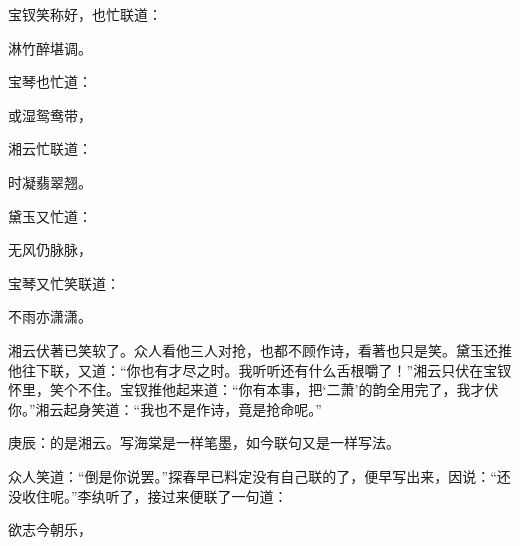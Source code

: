 \begin{parag}
    宝钗笑称好，也忙联道：
\end{parag}
\begin{poem}
    \begin{pl} 淋竹醉堪调。\end{pl}
\end{poem}


\begin{parag}
    宝琴也忙道：
\end{parag}
\begin{poem}
    \begin{pl} 或湿鸳鸯带，\end{pl}
\end{poem}


\begin{parag}
    湘云忙联道：
\end{parag}
\begin{poem}
    \begin{pl} 时凝翡翠翘。\end{pl}
\end{poem}


\begin{parag}
    黛玉又忙道：
\end{parag}
\begin{poem}
    \begin{pl} 无风仍脉脉，\end{pl}
\end{poem}


\begin{parag}
    宝琴又忙笑联道：
\end{parag}
\begin{poem}
    \begin{pl} 不雨亦潇潇。\end{pl}
\end{poem}


\begin{parag}
    湘云伏著已笑软了。众人看他三人对抢，也都不顾作诗，看著也只是笑。黛玉还推他往下联，又道：“你也有才尽之时。我听听还有什么舌根嚼了！”湘云只伏在宝钗怀里，笑个不住。宝钗推他起来道：“你有本事，把‘二萧’的韵全用完了，我才伏你。”湘云起身笑道：“我也不是作诗，竟是抢命呢。”\begin{note}庚辰：的是湘云。写海棠是一样笔墨，如今联句又是一样写法。\end{note}众人笑道：“倒是你说罢。”探春早已料定没有自己联的了，便早写出来，因说：“还没收住呢。”李纨听了，接过来便联了一句道：
\end{parag}
\begin{poem}
    \begin{pl} 欲志今朝乐，\end{pl}
\end{poem}


